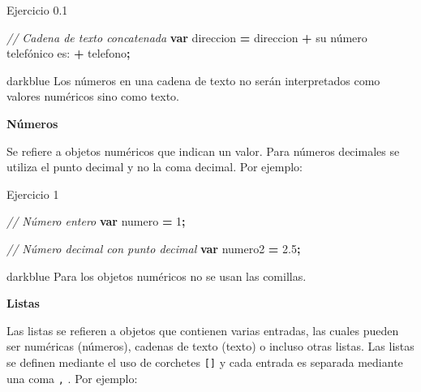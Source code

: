\documentclass[
  12pt,
  letterpaper,
  twoside]{book}
\newenvironment{Shaded}{\begin{snugshade}}{\end{snugshade}}
\newcommand{\CommentTok}[1]{\textcolor[rgb]{0.56,0.35,0.01}{\textit{#1}}}
\newcommand{\DecValTok}[1]{\textcolor[rgb]{0.00,0.00,0.81}{#1}}
\newcommand{\FloatTok}[1]{\textcolor[rgb]{0.00,0.00,0.81}{#1}}
\newcommand{\KeywordTok}[1]{\textcolor[rgb]{0.13,0.29,0.53}{\textbf{#1}}}
\newcommand{\NormalTok}[1]{#1}
\newcommand{\OperatorTok}[1]{\textcolor[rgb]{0.81,0.36,0.00}{\textbf{#1}}}
\newcommand{\StringTok}[1]{\textcolor[rgb]{0.31,0.60,0.02}{#1}}
\begin{document}
Ejercicio 0.1

\begin{Shaded}
\begin{Highlighting}[]
\CommentTok{// Cadena de texto concatenada}
\KeywordTok{var}\NormalTok{ direccion }\OperatorTok{=}\NormalTok{ direccion }\OperatorTok{+} \StringTok{\textquotesingle{} su número telefónico es:\textquotesingle{}} \OperatorTok{+}\NormalTok{ telefono}\OperatorTok{;}
\end{Highlighting}
\end{Shaded}

\begin{bluebox2}

\begin{awesomeblock}{5pt}{\faLightbulb}{darkblue}
Los números en una cadena de texto no serán interpretados como valores numéricos sino como texto.

\end{awesomeblock}

\end{bluebox2}

\textbf{Números}

Se refiere a objetos numéricos que indican un valor. Para números decimales se utiliza el punto decimal y no la coma decimal. Por ejemplo:

Ejercicio 1

\begin{Shaded}
\begin{Highlighting}[]
\CommentTok{// Número entero}
\KeywordTok{var}\NormalTok{ numero }\OperatorTok{=} \DecValTok{1}\OperatorTok{;} 
 
\CommentTok{// Número decimal con punto decimal  }
\KeywordTok{var}\NormalTok{ numero2 }\OperatorTok{=} \FloatTok{2.5}\OperatorTok{;}  
\end{Highlighting}
\end{Shaded}

\begin{bluebox2}

\begin{awesomeblock}{5pt}{\faLightbulb}{darkblue}
Para los objetos numéricos no se usan las comillas.

\end{awesomeblock}

\end{bluebox2}

\textbf{Listas}

Las listas se refieren a objetos que contienen varias entradas, las cuales pueden ser numéricas (números), cadenas de texto (texto) o incluso otras listas. Las listas se definen mediante el uso de corchetes \texttt{{[}{]}} y cada entrada es separada mediante una coma \texttt{,} . Por ejemplo:
\end{document}
